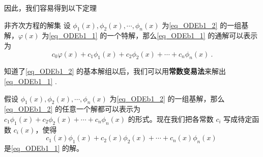 因此，我们容易得到以下定理
\begin{theorem}{非齐次方程的解集}
设 $\phi_1(x), \phi_2(x), \cdots, \phi_n(x)$ 为\autoref{eq_ODEb1_2} 的一组基解，$\varphi(x)$ 为\autoref{eq_ODEb1_1} 的一个特解，那么\autoref{eq_ODEb1_1} 的通解可以表示为
\begin{equation}
c_0\varphi(x)+c_1\phi_1(x)+c_2\phi_2(x)+\cdots+c_n\phi_n(x)~.
\end{equation}
\end{theorem}

知道了\autoref{eq_ODEb1_2} 的基本解组以后，我们可以用\textbf{常数变易法}来解出\autoref{eq_ODEb1_1} .

假设 $\phi_1(x), \phi_2(x), \cdots, \phi_n(x)$ 为\autoref{eq_ODEb1_2} 的一组基解，那么\autoref{eq_ODEb1_2} 的任意一个解都可以表示为 $c_1\phi_1(x)+c_2\phi_2(x)+\cdots+c_n\phi_n(x)$ 的形式。现在我们把各常数 $c_i$ 写成待定函数 $c_i(x)$，使得
\begin{equation}
c_1(x)\phi_1(x)+c_2(x)\phi_2(x)+\cdots+c_n(x)\phi_n(x)~
\end{equation}
是\autoref{eq_ODEb1_1} 的解。

